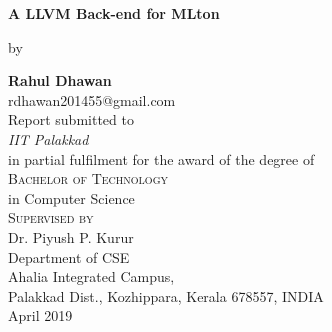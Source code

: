 \documentclass{book}
\begin{document}
\begin{titlepage}
\begin{center}
 {\huge\bfseries A LLVM Back-end for MLton \\}
 
 \vspace{1.5cm}
 by
 \vspace{0.02cm}
 
 \vspace{1.0cm}
 {\Large\bfseries Rahul Dhawan}\\[5pt]
 rdhawan201455@gmail.com\\[14pt]
 \vspace{2cm}
{Report  submitted to} \\[5pt]
\emph{{IIT Palakkad}}\\[2cm]
{in partial fulfilment for the award of the degree
 of} \\[2cm]
\textsc{\Large{{Bachelor of Technology }}} \\[5pt]
{in Computer Science} \vspace{0.4cm} \\[1cm]

\textsc{\Large{{Supervised by}}}   \\[5pt]
{Dr. Piyush P. Kurur} \vspace{0.4cm} \\[2cm]

 \vfill
{Department of CSE}\\[5pt]
{Ahalia Integrated Campus,}\\[5pt]
{ Palakkad Dist., Kozhippara, Kerala 678557,
 INDIA}\\
 \vfill
{April 2019}
\end{center}
\end{titlepage}
\end{document}

